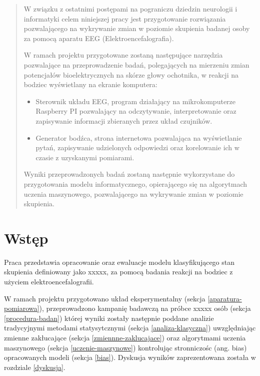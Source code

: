 \documentclass{./assets/wfis}
\begin{document}


\stronatytulowa

\begin{abstract}
W związku z ostatnimi postępami na pograniczu dziedzin neurologii i informatyki celem niniejszej pracy jest przygotowanie rozwiązania pozwalającego na wykrywanie zmian w poziomie skupienia badanej osoby za pomocą aparatu EEG (Elektroencefalografia).

W ramach projektu przygotowane zostaną następujące narzędzia pozwalające na przeprowadzenie badań, polegających na mierzeniu zmian potencjałów bioelektrycznych na skórze głowy ochotnika, w reakcji na bodziec wyświetlany na ekranie komputera:

\begin{itemize}
    \item Sterownik układu EEG, program działający na mikrokomputerze Raspberry PI pozwalający na odczytywanie, interpretowanie oraz zapisywanie informacji zbieranych przez układ czujników.
    \item Generator bodźca, strona internetowa pozwalająca na wyświetlanie pytań, zapisywanie udzielonych odpowiedzi oraz korelowanie ich w czasie z uzyskanymi pomiarami.
\end{itemize}

Wyniki przeprowadzonych badań zostaną następnie wykorzystane do przygotowania modelu informatycznego, opierającego się na algorytmach uczenia maszynowego, pozwalającego na wykrywanie zmian w poziomie skupienia.
\end{abstract}

\chapter{Wstęp}
Praca przedstawia opracowanie oraz ewaluacje modelu klasyfikującego stan skupienia definiowany jako  xxxxx, za pomocą badania reakcji na bodziec z użyciem elektroencefalografii. 

W ramach projektu przygotowano układ eksperymentalny (sekcja \ref{aparatura-pomiarowa}), przeprowadzono kampanię badawczą na próbce xxxxx osób (sekcja \ref{procedura-badan}) której wyniki zostały następnie poddane analizie tradycyjnymi metodami statysytcznymi (sekcja \ref{analiza-klasyczna}) uwzględniając zmienne zakłucające (sekcja \ref{zmiennne-zaklucajace}) oraz algorytmami uczenia maszynowego (sekcja \ref{uczenie-maszynowe}) kontrolując stronniczośc (ang. bias) opracowanych modeli (sekcja \ref{bias}). Dyskusja wyników zaprezentowana została w rozdziale \ref{dyskusja}.
\end{document}
